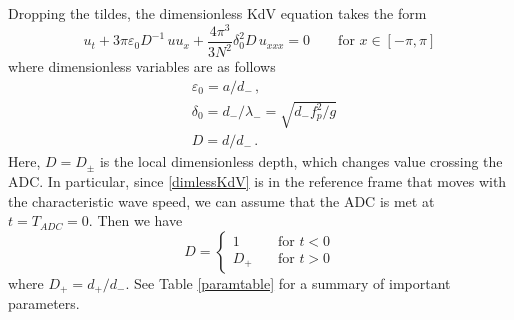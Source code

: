 \documentclass[11pt]{article}
\newcommand{\eps}{\varepsilon}
\newcommand{\freqp}{f_p}
\newcommand{\amp}{a}
\newcommand{\depth}{d}
\newcommand{\dup}{\depth_{-}}
\newcommand{\ddn}{\depth_{+}}
\newcommand{\lam}{\lambda}
\newcommand{\lamup}{\lam_{-}}
\newcommand{\lamfac}{N}
\newcommand{\drat}{D}
\newcommand{\dratdn}{\drat_+}
\newcommand{\dratupdn}{\drat_{\pm}}
\newcommand{\epsup}{\eps_0}
\newcommand{\delup}{\delta_0}
\begin{document}
\begin{comment}
Old Note (around May 2019): After giving it some deliberation, I believe we should use $\lamfac=1$. My reason is that the peak in the wave spectrum occurs at a frequency of $\freqp$ or wavelength of $\lam$. In the tKdV Gibbs measure, the spectrum decays monotonically, so that the peak is at the lowest resolved frequency (or largest resolved wavelength). Thus, we want $\lam$ to correspond to the largest resolved wavelength, i.e.~the length of the periodic domain in the tKdV framework.

New Thought (July 2019): Actually, it is very possible that the bandwidth (2 Hz in the experiments) sets the value of $\lamfac$ that is most appropriate, since that bandwidth sets the decay rate of the spectrum. My thinking is that our experimental forcing does not really follow the upstream Gibbs measure all that well (because we did not have that in mind), but perhaps it best approximates the tail decay of some Gibbs measure. Perhaps, the lowest frequencies (i.e. those much slower than 2 Hz that are present in the theory but almost absent in the experiments) do not affect statistics that much.
\end{comment}

Dropping the tildes, the dimensionless KdV equation takes the form
\begin{equation}
\label{dimlessKdV}
u_t + {3 \pi} \epsup \drat^{-1} \, u u_x + \frac{4 \pi^3}{3 \lamfac^2} \delup^2 \drat \, u_{xxx} = 0
\qquad \text{for } x \in [-\pi,\pi]
\end{equation}
where dimensionless variables are as follows
\begin{align}
&\epsup = \amp/\dup \, , \\
&\delup = \dup/\lamup = \sqrt{\dup \freqp^2/g} \, \\
&\drat = {\depth}/{\dup} \, .
\end{align}
Here, $\drat = \dratupdn$ is the local dimensionless depth, which changes value crossing the ADC. In particular, since \eqref{dimlessKdV} is in the reference frame that moves with the characteristic wave speed, we can assume that the ADC is met at $t = T_{ADC} = 0$. Then we have
\begin{equation}
\drat = 
\begin{cases}
1 		&\quad \mbox{for } t<0 \\
\dratdn 	&\quad \mbox{for } t>0
\end{cases}
\end{equation}
where $\dratdn = \ddn/\dup$.
See Table \ref{paramtable} for a summary of important parameters.
\end{document}

